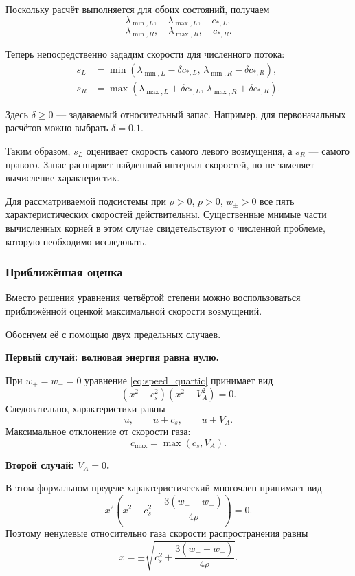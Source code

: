 \documentclass[11pt,a4paper]{article}
\begin{document}
Поскольку расчёт выполняется для обоих состояний,
получаем
\[
\lambda_{\min,L},\quad\lambda_{\max,L},\quad c_{*,L},
\]
\[
\lambda_{\min,R},\quad\lambda_{\max,R},\quad c_{*,R}.
\]

Теперь непосредственно зададим скорости
для численного потока:
\begin{equation}
\boxed{
\begin{aligned}
s_L&=\min\left(
\lambda_{\min,L}-\delta c_{*,L},\,
\lambda_{\min,R}-\delta c_{*,R}
\right),\\[3pt]
s_R&=\max\left(
\lambda_{\max,L}+\delta c_{*,L},\,
\lambda_{\max,R}+\delta c_{*,R}
\right).
\end{aligned}
}
\label{eq:speeds_exact}
\end{equation}

Здесь $\delta\ge0$ --- задаваемый относительный
запас. Например, для первоначальных расчётов
можно выбрать $\delta=0.1$.

Таким образом, $s_L$ оценивает скорость самого
левого возмущения, а $s_R$ --- самого правого.
Запас расширяет найденный интервал скоростей,
но не заменяет вычисление характеристик.

Для рассматриваемой подсистемы при
$\rho>0$, $p>0$, $w_\pm>0$ все пять
характеристических скоростей действительны.
Существенные мнимые части вычисленных корней
в этом случае свидетельствуют о численной
проблеме, которую необходимо исследовать.

\subsubsection{Приближённая оценка}

Вместо решения уравнения четвёртой степени
можно воспользоваться приближённой оценкой
максимальной скорости возмущений.

Обоснуем её с помощью двух предельных случаев.

\textbf{Первый случай: волновая энергия равна нулю.}

При $w_+=w_-=0$ уравнение
\eqref{eq:speed_quartic} принимает вид
\[
(x^2-c_s^2)(x^2-V_A^2)=0.
\]
Следовательно, характеристики равны
\[
u,\qquad u\pm c_s,\qquad u\pm V_A.
\]
Максимальное отклонение от скорости газа:
\[
c_{\max}=\max(c_s,V_A).
\]

\textbf{Второй случай: $V_A=0$.}

В этом формальном пределе характеристический
многочлен принимает вид
\[
x^2\left(
x^2-c_s^2-\frac{3(w_++w_-)}{4\rho}
\right)=0.
\]
Поэтому ненулевые относительно газа скорости
распространения равны
\[
x=\pm\sqrt{
c_s^2+\frac{3(w_++w_-)}{4\rho}
}.
\]
\end{document}
